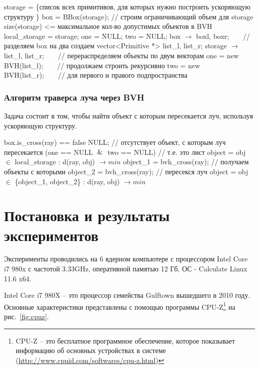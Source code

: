 \documentclass[12pt, a4paper, utf8]{article}
\begin{document}
\vspace{-0.6cm}
\begin{codebox}
\li storage = \{список всех примитивов, для которых нужно построить ускоряющую структуру \}
\li box = BBox(storage);     // строим ограничивающий объем для storage
\li \If size(storage) <= максимальное кол-во допустимых объектов в BVH
\li \Then
\li local\_storage = storage;
\li one = NULL;
\li two = NULL;
\li \Else
\li box $\to$ boxl, boxr;\ \ \ \ // разделяем box на два
\li создаем vector<Primitive *> list\_l, list\_r;
\li storage $\to$ list\_l, list\_r;\ \ \ \ // перераспределяем объекты по двум векторам
\li one = new BVH(list\_l);\ \ \ \ // продолжаем строить рекурсивно
\li two = new BVH(list\_r);\ \ \ \ // для первого и правого подпространства
\end{codebox}

\subsubsection{Алгоритм траверса луча через BVH}

Задача состоит в том, чтобы найти объект с которым пересекается луч, используя ускоряющую структуру.

\begin{codebox}
\li \If box.is\_cross(ray) == false
\li \Then 
\li \Return NULL; // отсутствует объект, с которым луч пересекается
\li \Else
\li \If (one == NULL $\And$ two == NULL) // т.е. это лист
\li \Then 
\li \Return object = obj $\in$ local\_storage : d(ray, obj) $\to min$
\li \Else
\li object\_1 = bvh\_cross(ray); // получаем объекты с которыми
\li object\_2 = bvh\_cross(ray); // пересекся луч
\li \Return object = obj $\in$ \{object\_1, object\_2\} : d(ray, obj) $\to min$
\end{codebox}


\newpage
\section{Постановка и результаты экспериментов}

Эксперименты проводились на 6 ядерном компьютере с процессором Intel Core i7 980x с частотой 3.33GHz, оперативной памятью 12 Гб, ОС - Calculate Linux 11.6 x64. 

Intel Core i7 980X -- это процессор семейства Gulftown вышедшего в 2010 году. Основные характеристики представлены с помощью программы CPU-Z\footnote{CPU-Z -- это бесплатное программное обеспечение, которое показывает информацию об основных устройствах в системе (\href{http://www.cpuid.com/softwares/cpu-z.html}{http://www.cpuid.com/softwares/cpu-z.html})} на рис.~\ref{fig:cpuz}.
\end{document}
